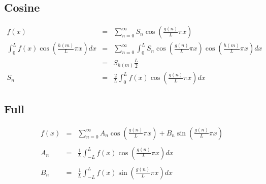 \documentclass[12pt]{article}
\begin{document}
\subsection{Cosine}
	\begin{eqnarray*}
	 f(x) &=& \displaystyle\sum\limits_{n = 0}^{\infty} S_n \cos\left(\frac{g(n)}{L}\pi x \right) \\
	 \displaystyle \int_{0}^{L} f(x)\cos\left(\frac{h(m)}{L}\pi x\right) dx &=& \sum\limits_{n = 0}^{\infty} \int_{0}^{L} S_n \cos\left(\frac{g(n)}{L}\pi x \right) \cos\left(\frac{h(m)}{L}\pi x\right) dx \\
	&=& S_{h(m)} \frac{L}{2} \\
	S_n &=&  \displaystyle \frac{2}{L} \int_{0}^{L} f(x)\cos\left(\frac{g(n)}{L}\pi x\right) dx
	\end{eqnarray*}
\subsection{Full}
	\begin{eqnarray*}
	 f(x) &=& \displaystyle\sum\limits_{n = 0}^{\infty} A_n \cos\left(\frac{g(n)}{L}\pi x \right) + B_n \sin \left( \frac{g(n)}{L} \pi x \right) \\ \\
	A_n &=&  \displaystyle \frac{1}{L} \int_{-L}^{L} f(x)\cos\left(\frac{g(n)}{L}\pi x\right) dx \\ \\
	B_n &=&  \displaystyle \frac{1}{L} \int_{-L}^{L} f(x)\sin\left(\frac{g(n)}{L}\pi x\right) dx \\ \\
	\end{eqnarray*}
\end{document}
